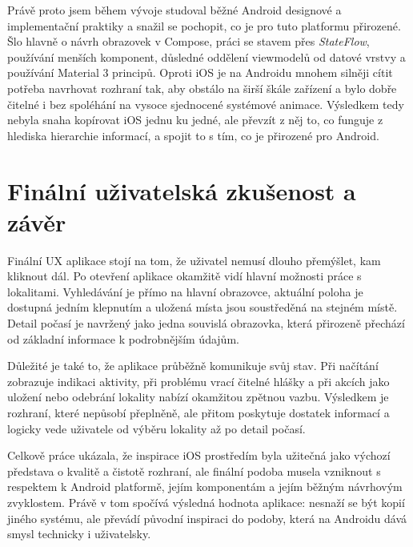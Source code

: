 \documentclass[12pt,a4paper]{article}
\begin{document}
Právě proto jsem během vývoje studoval běžné Android designové a implementační praktiky a snažil se pochopit, co je pro tuto platformu přirozené. Šlo hlavně o návrh obrazovek v Compose, práci se stavem přes \textit{StateFlow}, používání menších komponent, důsledné oddělení viewmodelů od datové vrstvy a používání Material 3 principů. Oproti iOS je na Androidu mnohem silněji cítit potřeba navrhovat rozhraní tak, aby obstálo na širší škále zařízení a bylo dobře čitelné i bez spoléhání na vysoce sjednocené systémové animace. Výsledkem tedy nebyla snaha kopírovat iOS jednu ku jedné, ale převzít z něj to, co funguje z hlediska hierarchie informací, a spojit to s tím, co je přirozené pro Android.

\section{Finální uživatelská zkušenost a závěr}
Finální UX aplikace stojí na tom, že uživatel nemusí dlouho přemýšlet, kam kliknout dál. Po otevření aplikace okamžitě vidí hlavní možnosti práce s lokalitami. Vyhledávání je přímo na hlavní obrazovce, aktuální poloha je dostupná jedním klepnutím a uložená místa jsou soustředěná na stejném místě. Detail počasí je navržený jako jedna souvislá obrazovka, která přirozeně přechází od základní informace k podrobnějším údajům.

Důležité je také to, že aplikace průběžně komunikuje svůj stav. Při načítání zobrazuje indikaci aktivity, při problému vrací čitelné hlášky a při akcích jako uložení nebo odebrání lokality nabízí okamžitou zpětnou vazbu. Výsledkem je rozhraní, které nepůsobí přeplněně, ale přitom poskytuje dostatek informací a logicky vede uživatele od výběru lokality až po detail počasí.

Celkově práce ukázala, že inspirace iOS prostředím byla užitečná jako výchozí představa o kvalitě a čistotě rozhraní, ale finální podoba musela vzniknout s respektem k Android platformě, jejím komponentám a jejím běžným návrhovým zvyklostem. Právě v tom spočívá výsledná hodnota aplikace: nesnaží se být kopií jiného systému, ale převádí původní inspiraci do podoby, která na Androidu dává smysl technicky i uživatelsky.
\end{document}
